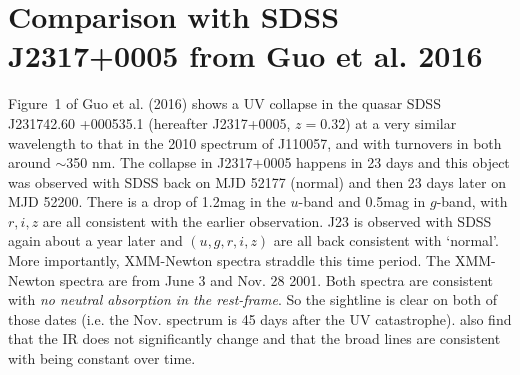 \documentclass[11pt,a4paper]{article}
\begin{document}
\begin{table}
    \caption{Here, $\alpha$ is the viscosity of the disk; $\rho_{\rm cloud}$ is ; $\rho_{\rm medium}$ is  ;
      $R$ is the radius of the accretion disk; $r_{g}$ is the Gravitational radius; 
      $V_{\rm rel}$ is .}
    \label{tab:timescales}
    \centering
  \end{table}


\section*{Comparison with SDSS J2317+0005 from Guo et al. 2016}
Figure~1 of Guo et al. (2016) shows a UV collapse in the 
quasar SDSS  J231742.60 +000535.1 (hereafter J2317+0005, 
$z=0.32$) at a very similar wavelength to that in the 2010
spectrum of J110057, and with turnovers in both around
$\sim$350 nm.  The collapse in J2317+0005 happens in 23 days \citep[Figure 2
of ][]{Guo2016} and this object was observed with SDSS back on MJD
52177 (normal) and then 23 days later on MJD 52200. There is a drop of
1.2mag in the $u$-band and 0.5mag in $g$-band, with $r,i,z$ are all
consistent with the earlier observation. J23 is observed with SDSS
again about a year later and $(u,g,r,i,z)$ are all back consistent
with `normal'. More importantly, XMM-Newton spectra straddle this time
period. The XMM-Newton spectra are from June 3 and Nov. 28 2001. Both
spectra are consistent with {\it no neutral absorption in the
rest-frame}. So the sightline is clear on both of those dates
(i.e. the Nov. spectrum is 45 days after the UV
catastrophe). \citet{Guo2016} also find that the IR does not
significantly change and that the broad lines are consistent with
being constant over time.
\end{document}

